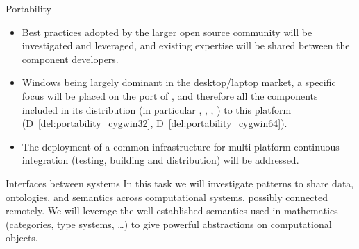 \begin{Workpackage}{\thewpno}
\begin{task}{Portability}
    \begin{itemize}
    \item Best practices adopted by the larger open source community
      will be investigated and leveraged, and existing expertise will
      be shared between the component developers.
    \item Windows being largely dominant in the desktop/laptop market,
      a specific focus will be placed on the port of \Sage, and
      therefore all the components included in its distribution (in
      particular \Pari, \GAP, \Singular, \Linbox) to this platform
      (D~\ref{del:portability_cygwin32}, D~\ref{del:portability_cygwin64}).
    \item The deployment of a common infrastructure for multi-platform
      continuous integration (testing, building and distribution) will
      be addressed.
    \end{itemize}

  \end{task}

  \begin{task}{Interfaces between systems}
    In this task we will investigate patterns to share data,
    ontologies, and semantics across computational systems, possibly
    connected remotely.  We will leverage the well established
    semantics used in mathematics (categories, type systems, \dots) to
    give powerful abstractions on computational objects.
    

\end{task}
\end{Workpackage}

